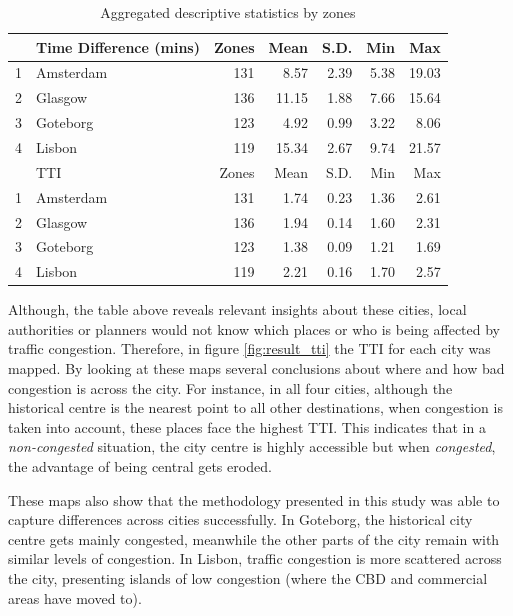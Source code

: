 \documentclass[a4paper]{jpconf}
\begin{document}
	\begin{table}[ht]		
		\centering
		\begin{tabular}{rlrrrrr}
			\hline
			& Time Difference (mins) & Zones & Mean & S.D. & Min & Max \\ 
			\hline
			1 & Amsterdam 	& 131 	& 8.57  & 2.39 & 5.38 & 19.03 \\ 
			2 & Glasgow 	& 136 	& 11.15 & 1.88 & 7.66 & 15.64 \\ 
			3 & Goteborg 	& 123 	& 4.92  & 0.99 & 3.22 & 8.06  \\ 
			4 & Lisbon 		& 119 	& 15.34 & 2.67 & 9.74 & 21.57 \\ 
			
			\hline
			& TTI	& Zones & Mean & S.D. & Min & Max \\ 
			\hline
			1 & Amsterdam 	& 131 & 1.74 & 0.23 & 1.36 & 2.61 \\ 
			2 & Glasgow 	& 136 & 1.94 & 0.14 & 1.60 & 2.31 \\ 
			3 & Goteborg	& 123 & 1.38 & 0.09 & 1.21 & 1.69 \\ 
			4 & Lisbon 		& 119 & 2.21 & 0.16 & 1.70 & 2.57 \\ 
			\hline
		\end{tabular}
		\caption {Aggregated descriptive statistics by zones}
		\label{tab:Results_grids}
	\end{table}
	
	Although, the table above reveals relevant insights about these cities, local authorities or planners would not know which places or who is being affected by traffic congestion. Therefore, in figure \ref{fig:result_tti} the TTI for each city was mapped. By looking at these maps several conclusions about where and how bad congestion is across the city. For instance, in all four cities, although the historical centre is the nearest point to all other destinations, when congestion is taken into account, these places face the highest TTI. This indicates that in a \textit{non-congested} situation, the city centre is highly accessible but when \textit{congested}, the advantage of being central gets eroded. \par
	These maps also show that the methodology presented in this study 
	was able to capture differences across cities successfully. In Goteborg, the historical city centre gets mainly congested, meanwhile the other parts of the city remain with similar levels of congestion. In Lisbon, traffic congestion is more scattered across the city, presenting islands of low congestion (where the CBD and commercial areas have moved to).
	
\end{document}
